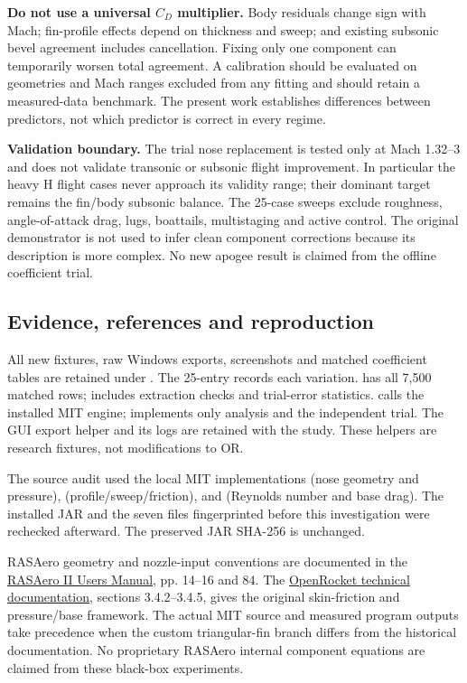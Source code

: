 \documentclass[oneside,openany]{amsdtx}
\begin{document}
\textbf{Do not use a universal $C_D$ multiplier.} Body residuals change sign with Mach; fin-profile effects depend on thickness and sweep; and existing subsonic bevel agreement includes cancellation. Fixing only one component can temporarily worsen total agreement. A calibration should be evaluated on geometries and Mach ranges excluded from any fitting and should retain a measured-data benchmark. The present work establishes differences between predictors, not which predictor is correct in every regime.

\textbf{Validation boundary.} The trial nose replacement is tested only at Mach 1.32--3 and does not validate transonic or subsonic flight improvement. In particular the heavy H flight cases never approach its validity range; their dominant target remains the fin/body subsonic balance. The 25-case sweeps exclude roughness, angle-of-attack drag, lugs, boattails, multistaging and active control. The original demonstrator is not used to infer clean component corrections because its description is more complex. No new apogee result is claimed from the offline coefficient trial.

\subsection{Evidence, references and reproduction}
All new fixtures, raw Windows exports, screenshots and matched coefficient tables are retained under . The 25-entry  records each variation.  has all 7,500 matched rows;  includes extraction checks and trial-error statistics.  calls the installed MIT engine;  implements only analysis and the independent trial. The GUI export helper and its logs are retained with the study. These helpers are research fixtures, not modifications to OR.

The source audit used the local MIT implementations  (nose geometry and pressure),  (profile/sweep/friction), and  (Reynolds number and base drag). The installed JAR and the seven files fingerprinted before this investigation were rechecked afterward. The preserved JAR SHA-256 is unchanged.

RASAero geometry and nozzle-input conventions are documented in the \href{https://www.rasaero.com/dloads/RASAero\%20II\%20Users\%20Manual.pdf}{RASAero II Users Manual}, pp. 14--16 and 84. The \href{https://openrocket.info/documentation.html}{OpenRocket technical documentation}, sections 3.4.2--3.4.5, gives the original skin-friction and pressure/base framework. The actual MIT source and measured program outputs take precedence when the custom triangular-fin branch differs from the historical documentation. No proprietary RASAero internal component equations are claimed from these black-box experiments.
\end{document}
